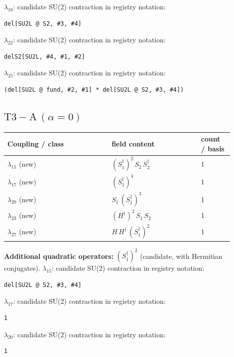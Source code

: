 \documentclass[9pt,a4paper]{article}
\begin{document}
\textbf{$ \lambda_{18} $}: candidate SU(2) contraction in registry notation:
\begin{lstlisting}[mathescape=true]
del[SU2L @ S2, #3, #4]
\end{lstlisting}

\textbf{$ \lambda_{22} $}: candidate SU(2) contraction in registry notation:
\begin{lstlisting}[mathescape=true]
delS2[SU2L, #4, #1, #2]
\end{lstlisting}

\textbf{$ \lambda_{25} $}: candidate SU(2) contraction in registry notation:
\begin{lstlisting}[mathescape=true]
(del[SU2L @ fund, #2, #1] * del[SU2L @ S2, #3, #4])
\end{lstlisting}

\subsection*{$ \mathrm{T3-A}\,(\alpha=0) $}
\begin{longtable}{@{}p{0.42\linewidth}p{0.36\linewidth}p{0.13\linewidth}@{}}
\toprule
Coupling / class & field content & count / basis\\
\midrule
\endhead
$\lambda_{15}$ (new) & $\left(S_1^\dagger\right)^{2}\, S_2\, S_2^\dagger$ & 1 \\
$\lambda_{17}$ (new) & $\left(S_1^\dagger\right)^{4}$ & 1 \\
$\lambda_{20}$ (new) & $S_1\, \left(S_1^\dagger\right)^{3}$ & 1 \\
$\lambda_{23}$ (new) & $\left(H^\dagger\right)^{2}\, S_1\, S_2$ & 1 \\
$\lambda_{27}$ (new) & $H\, H^\dagger\, \left(S_1^\dagger\right)^{2}$ & 1 \\
\bottomrule
\end{longtable}
\textbf{Additional quadratic operators:}
$\left(S_1^\dagger\right)^{2}$ (candidate, with Hermitian conjugates).
\textbf{$ \lambda_{15} $}: candidate SU(2) contraction in registry notation:
\begin{lstlisting}[mathescape=true]
del[SU2L @ S2, #3, #4]
\end{lstlisting}

\textbf{$ \lambda_{17} $}: candidate SU(2) contraction in registry notation:
\begin{lstlisting}[mathescape=true]
1
\end{lstlisting}

\textbf{$ \lambda_{20} $}: candidate SU(2) contraction in registry notation:
\begin{lstlisting}[mathescape=true]
1
\end{lstlisting}
\end{document}
